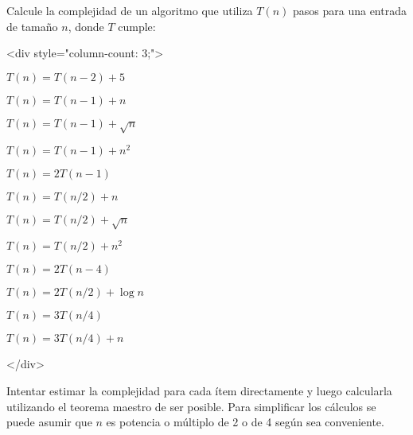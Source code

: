 
Calcule la complejidad de un algoritmo que utiliza $T(n)$ pasos para una
entrada de tamaño $n$, donde $T$ cumple:


<div style="column-count: 3;">

\item $T(n) = T(n-2) + 5$
\item $T(n) = T(n-1) + n$
\item $T(n) = T(n-1) + \sqrt{n}$
\item $T(n) = T(n-1) + n^2$
\item $T(n) = 2 T(n-1)$
\item $T(n) = T(n/2) + n$
\item $T(n) = T(n/2) + \sqrt{n}$
\item $T(n) = T(n/2) + n^2$
\item $T(n) = 2 T(n-4)$
\item $T(n) = 2 T(n/2) + \log n$
\item $T(n) = 3 T(n/4)$
\item $T(n) = 3 T(n/4) + n$

</div>


Intentar estimar la complejidad para cada ítem directamente y luego calcularla
utilizando el teorema maestro de ser posible. Para simplificar los cálculos se
puede asumir que $n$ es potencia o múltiplo de 2 o de 4 según sea conveniente.

